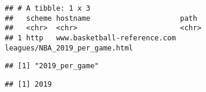 \documentclass[]{article}
\newenvironment{Shaded}{\begin{snugshade}}{\end{snugshade}}
\newcommand{\KeywordTok}[1]{\textcolor[rgb]{0.13,0.29,0.53}{\textbf{#1}}}
\newcommand{\DecValTok}[1]{\textcolor[rgb]{0.00,0.00,0.81}{#1}}
\newcommand{\CharTok}[1]{\textcolor[rgb]{0.31,0.60,0.02}{#1}}
\newcommand{\StringTok}[1]{\textcolor[rgb]{0.31,0.60,0.02}{#1}}
\newcommand{\CommentTok}[1]{\textcolor[rgb]{0.56,0.35,0.01}{\textit{#1}}}
\newcommand{\OperatorTok}[1]{\textcolor[rgb]{0.81,0.36,0.00}{\textbf{#1}}}
\newcommand{\NormalTok}[1]{#1}
\begin{document}
\begin{verbatim}
## # A tibble: 1 x 3
##   scheme hostname                     path                          
##   <chr>  <chr>                        <chr>                         
## 1 http   www.basketball-reference.com leagues/NBA_2019_per_game.html
\end{verbatim}

\begin{Shaded}
\end{Shaded}

\begin{verbatim}
## [1] "2019_per_game"
\end{verbatim}

\begin{Shaded}
\end{Shaded}

\begin{verbatim}
## [1] 2019
\end{verbatim}
\end{document}
